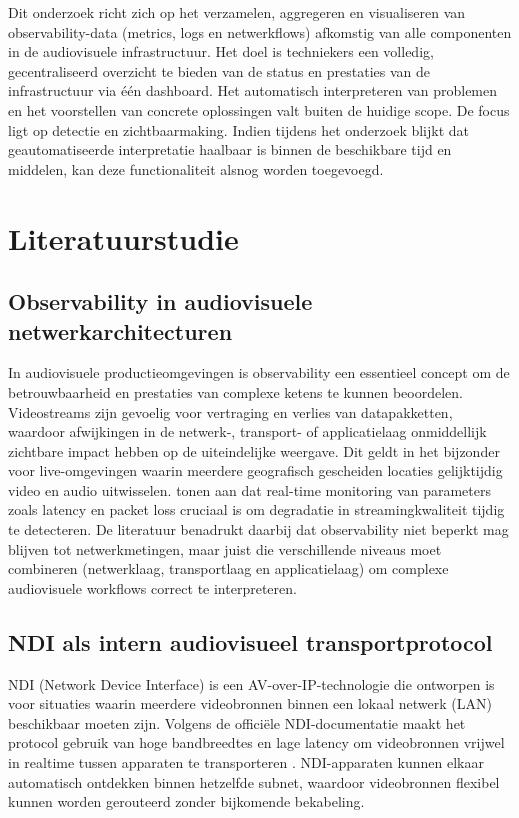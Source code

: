 Dit onderzoek richt zich op het verzamelen, aggregeren en visualiseren van observability-data (metrics, logs en netwerk\-flows) afkomstig van alle componenten in de audiovisuele infrastructuur. Het doel is techniekers een volledig, gecentraliseerd overzicht te bieden van de status en prestaties van de infrastructuur via één dashboard. Het automatisch interpreteren van problemen en het voorstellen van concrete oplossingen valt buiten de huidige scope. De focus ligt op detectie en zichtbaarmaking. Indien tijdens het onderzoek blijkt dat geautomatiseerde interpretatie haalbaar is binnen de beschikbare tijd en middelen, kan deze functionaliteit alsnog worden toegevoegd.


\section{Literatuurstudie}
\label{sec:literatuurstudie}

\subsection{Observability in audiovisuele netwerkarchitecturen}

In audiovisuele productieomgevingen is observability een essentieel concept om de betrouwbaarheid en prestaties van complexe ketens te kunnen beoordelen. Videostreams zijn gevoelig voor vertraging en verlies van datapakketten, waardoor afwijkingen in de netwerk-, transport- of applicatielaag onmiddellijk zichtbare impact hebben op de uiteindelijke weergave. Dit geldt in het bijzonder voor live-omgevingen waarin meerdere geografisch gescheiden locaties gelijktijdig video en audio uitwisselen. \textcite{Tommasi2021} tonen aan dat real-time monitoring van parameters zoals latency en packet loss cruciaal is om degradatie in streamingkwaliteit tijdig te detecteren. De literatuur benadrukt daarbij dat observability niet beperkt mag blijven tot netwerkmetingen, maar juist die verschillende niveaus moet combineren (netwerklaag, transportlaag en applicatielaag) om complexe audiovisuele workflows correct te interpreteren.

\subsection{NDI als intern audiovisueel transportprotocol}

NDI (Network Device Interface) is een AV-over-IP-technologie die ontworpen is voor situaties waarin meerdere videobronnen binnen een lokaal netwerk (LAN) beschikbaar moeten zijn. Volgens de officiële NDI-documentatie maakt het protocol gebruik van hoge bandbreedtes en lage latency om videobronnen vrijwel in realtime tussen apparaten te transporteren \autocite{NewTek2022}. NDI-apparaten kunnen elkaar automatisch ontdekken binnen hetzelfde subnet, waardoor videobronnen flexibel kunnen worden gerouteerd zonder bijkomende bekabeling.


